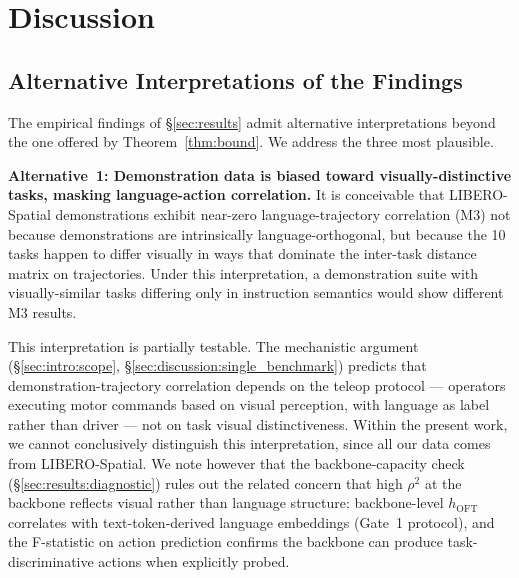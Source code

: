 
\section{Discussion}
\label{sec:discussion}

\subsection{Alternative Interpretations of the Findings}
\label{sec:discussion:alternatives}

The empirical findings of \S\ref{sec:results} admit alternative interpretations beyond the
one offered by Theorem~\ref{thm:bound}. We address the three most plausible.

\textbf{Alternative~1: Demonstration data is biased toward visually-distinctive tasks,
masking language-action correlation.} It is conceivable that LIBERO-Spatial demonstrations
exhibit near-zero language-trajectory correlation (M3) not because demonstrations are
intrinsically language-orthogonal, but because the 10 tasks happen to differ visually in
ways that dominate the inter-task distance matrix on trajectories. Under this
interpretation, a demonstration suite with visually-similar tasks differing only in
instruction semantics would show different M3 results.

This interpretation is partially testable. The mechanistic argument
(\S\ref{sec:intro:scope}, \S\ref{sec:discussion:single_benchmark}) predicts that
demonstration-trajectory correlation depends on the teleop protocol --- operators
executing motor commands based on visual perception, with language as label rather than
driver --- not on task visual distinctiveness. Within the present work, we cannot
conclusively distinguish this interpretation, since all our data comes from
LIBERO-Spatial. We note however that the backbone-capacity check
(\S\ref{sec:results:diagnostic}) rules out the related concern that high $\rho^2$ at the
backbone reflects visual rather than language structure: backbone-level $h_{\mathrm{OFT}}$
correlates with text-token-derived language embeddings (Gate~1 protocol), and the
F-statistic on action prediction confirms the backbone can produce task-discriminative
actions when explicitly probed.

